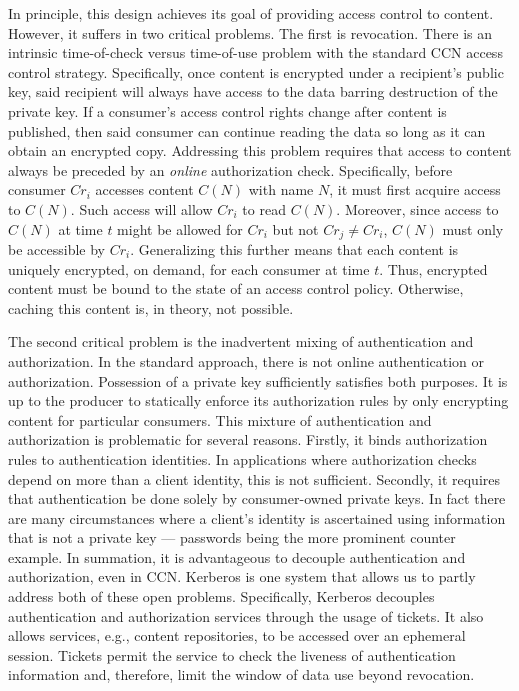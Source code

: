 In principle, this design achieves its goal of providing access control to content.
However, it suffers in two critical problems. The first is revocation. There is an
intrinsic time-of-check versus time-of-use problem with the standard CCN access
control strategy. Specifically, once content is encrypted under a recipient’s
public key, said recipient will always have access to the data barring destruction
of the private key. If a consumer’s access control rights change after content
is published, then said consumer can continue reading the data so long as it can
obtain an encrypted copy. Addressing this problem requires that access to content
always be preceded by an \emph{online} authorization check. Specifically, before
consumer $Cr_i$ accesses content $C(N)$ with name $N$, it must first acquire access
to $C(N)$. Such access will allow $Cr_i$ to read $C(N)$. Moreover, since access to
$C(N)$ at time $t$ might be allowed for $Cr_i$ but not $Cr_j \not= Cr_i$, $C(N)$ must
only be accessible by $Cr_i$. Generalizing this further means that each content is
uniquely encrypted, on demand, for each consumer at time $t$. Thus, encrypted content
must be bound to the state of an access control policy. Otherwise, caching this
content is, in theory, not possible.

The second critical problem is the inadvertent mixing of authentication and authorization.
In the standard approach, there is not online authentication or authorization. Possession
of a private key sufficiently satisfies both purposes. It is up to the producer to
statically enforce its authorization rules by only encrypting content for particular
consumers. This mixture of authentication and authorization is problematic for several
reasons. Firstly, it binds authorization rules to authentication identities. In
applications where authorization checks depend on more than a client identity, this is
not sufficient. Secondly, it requires that authentication be done solely by consumer-owned
private keys. In fact there are many circumstances where a client’s identity is ascertained
using information that is not a private key — passwords being the more prominent counter
example. In summation, it is advantageous to decouple authentication and authorization,
even in CCN. Kerberos is one system that allows us to partly address both of these open
problems. Specifically, Kerberos decouples authentication and authorization services
through the usage of tickets. It also allows services, e.g., content repositories, to
be accessed over an ephemeral session. Tickets permit the service to check the liveness
of authentication information and, therefore, limit the window of data use beyond revocation.

